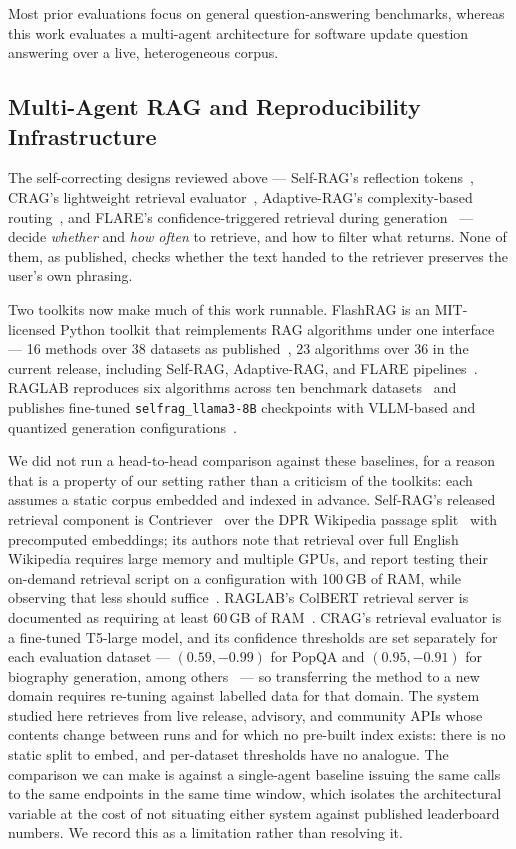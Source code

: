 \documentclass[acmsmall,anonymous,screen]{acmart}
\begin{document}
Most prior evaluations focus on general question-answering benchmarks, whereas
this work evaluates a multi-agent architecture for software update question
answering over a live, heterogeneous corpus.

\subsection{Multi-Agent RAG and Reproducibility Infrastructure}

The self-correcting designs reviewed above --- Self-RAG's reflection
tokens~\cite{asai2024selfrag}, CRAG's lightweight retrieval
evaluator~\cite{yan2024crag}, Adaptive-RAG's complexity-based
routing~\cite{jeong2024adaptiverag}, and FLARE's confidence-triggered retrieval
during generation~\cite{jiang2023flare} --- decide \emph{whether} and \emph{how
often} to retrieve, and how to filter what returns. None of them, as published,
checks whether the text handed to the retriever preserves the user's own
phrasing.

Two toolkits now make much of this work runnable. FlashRAG is an MIT-licensed
Python toolkit that reimplements RAG algorithms under one interface --- 16
methods over 38 datasets as published~\cite{jin2025flashrag}, 23 algorithms over
36 in the current release, including Self-RAG, Adaptive-RAG, and FLARE
pipelines~\cite{flashrag2025repo}. RAGLAB reproduces six algorithms across ten
benchmark datasets~\cite{zhang2024raglab} and publishes fine-tuned
\texttt{selfrag\_llama3-8B} checkpoints with VLLM-based and quantized generation
configurations~\cite{raglab2024repo}.

We did not run a head-to-head comparison against these baselines, for a reason
that is a property of our setting rather than a criticism of the toolkits: each
assumes a static corpus embedded and indexed in advance. Self-RAG's released
retrieval component is Contriever~\cite{izacard2022contriever} over the DPR
Wikipedia passage split~\cite{karpukhin2020dpr} with precomputed embeddings; its
authors note that retrieval over full English Wikipedia requires large memory
and multiple GPUs, and report testing their on-demand retrieval script on a
configuration with 100\,GB of RAM, while observing that less should
suffice~\cite{selfrag2023repo}. RAGLAB's ColBERT retrieval server is documented
as requiring at least 60\,GB of RAM~\cite{raglab2024repo}. CRAG's retrieval
evaluator is a fine-tuned T5-large model, and its confidence thresholds are set
separately for each evaluation dataset --- $(0.59, -0.99)$ for PopQA and
$(0.95, -0.91)$ for biography generation, among others~\cite{yan2024crag} --- so
transferring the method to a new domain requires re-tuning against labelled data
for that domain. The system studied here retrieves from live release, advisory,
and community APIs whose contents change between runs and for which no pre-built
index exists: there is no static split to embed, and per-dataset thresholds have
no analogue. The comparison we can make is against a single-agent baseline
issuing the same calls to the same endpoints in the same time window, which
isolates the architectural variable at the cost of not situating either system
against published leaderboard numbers. We record this as a limitation rather than
resolving it.
\end{document}
